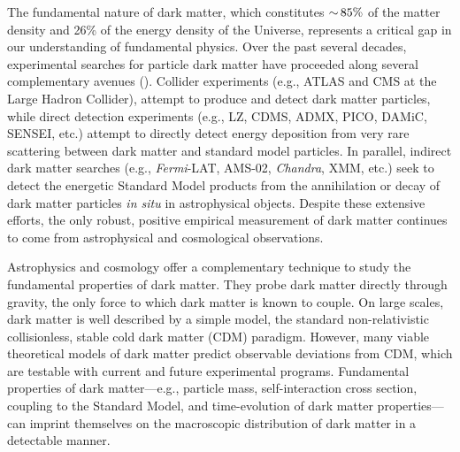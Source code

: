 
The fundamental nature of dark matter, which constitutes $ {\sim}\, 85\%$ of the matter density and 26\% of the energy density of the Universe, represents a critical gap in our understanding of fundamental physics.
Over the past several decades, experimental searches for particle dark matter have proceeded along several complementary avenues ().
Collider experiments (e.g., ATLAS and CMS at the Large Hadron Collider), attempt to produce and detect dark matter particles, while  %
direct detection experiments (e.g., LZ, CDMS, ADMX, PICO, DAMiC, SENSEI, etc.) attempt to directly detect energy deposition from very rare scattering between dark matter and standard model particles.
In parallel, indirect dark matter searches (e.g., {\it Fermi}-LAT, AMS-02, {\it Chandra}, XMM, etc.) seek to detect the energetic Standard Model products from the annihilation or decay of dark matter particles {\it in situ} in astrophysical objects. %
Despite these extensive efforts, the only robust, positive empirical measurement of dark matter continues to come from astrophysical and cosmological observations. 




Astrophysics and cosmology offer a complementary technique to study the fundamental properties of dark matter. 
They probe dark matter directly through gravity, the only force to which dark matter is known to couple. On large scales, dark matter is well described by a simple model, the standard non-relativistic collisionless, stable cold dark matter (CDM) paradigm.
However, many viable theoretical models of dark matter predict observable deviations from CDM, which are testable with current and future experimental programs.
Fundamental properties of dark matter---e.g., particle mass, self-interaction cross section, coupling to the Standard Model, and time-evolution of dark matter properties---can imprint themselves on the macroscopic distribution of dark matter in a detectable manner.

